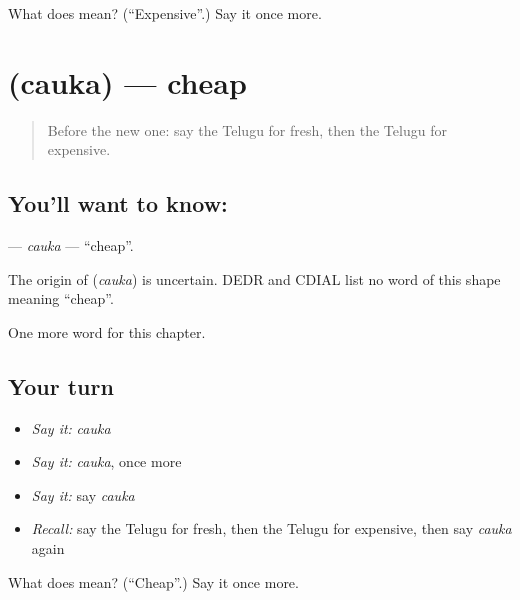 \begin{tcolorbox}[breakable,colback=teal!4,colframe=teal!35!black,title={Before you move on}]
What does  mean? (\textquotedblleft{}Expensive\textquotedblright{}.) Say it once more.
\end{tcolorbox}
\section[\texorpdfstring{\te{చౌక} (cauka)}{చౌక (cauka)}]{ (cauka) — cheap}

\label{lesson:TE-C179-cauka}



\begin{quote}
Before the new one: say the Telugu for fresh, then the Telugu for expensive.
\end{quote}

\subsection*{You'll want to know: }
\textbf{} — \emph{cauka} — \textquotedblleft{}cheap\textquotedblright{}.

\begin{cousinweb}
The origin of \textbf{} (\emph{cauka}) is uncertain. DEDR and CDIAL list no word of this shape meaning \textquotedblleft{}cheap\textquotedblright{}.
\end{cousinweb}

\begin{grammarlens}[title={What you've built}]
One more word for this chapter.
\end{grammarlens}

\subsection*{Your turn}
\begin{itemize}
\raggedright
  \item \emph{Say it:} \emph{cauka}
  \item \emph{Say it:} \emph{cauka}, once more
  \item \emph{Say it:} say \emph{cauka}
  \item \emph{Recall:} say the Telugu for fresh, then the Telugu for expensive, then say \emph{cauka} again
\end{itemize}

\begin{tcolorbox}[breakable,colback=teal!4,colframe=teal!35!black,title={Before you move on}]
What does  mean? (\textquotedblleft{}Cheap\textquotedblright{}.) Say it once more.
\end{tcolorbox}
